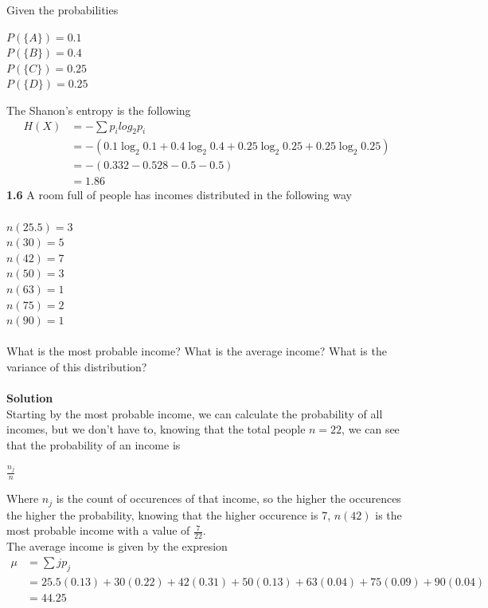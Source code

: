 \documentclass{article}
\begin{document}
Given the probabilities \\
\begin{center}
$P(\{A\}) = 0.1$\\
$P(\{B\}) = 0.4$\\
$P(\{C\}) = 0.25$\\
$P(\{D\}) = 0.25$\\
\end{center}
The Shanon's entropy is the following\\
\begin{align*}
H(X) &= - \sum p_i log_2 p_i\\
&= -(0.1 \log_2 0.1 + 0.4 \log_2 0.4 + 0.25 \log_2 0.25 + 0.25 \log_2 0.25)\\
&= -(0.332 - 0.528 - 0.5 - 0.5)\\
&= 1.86
\end{align*}
\textbf{1.6} A room full of people has incomes distributed in the following way\\ \\
$n(25.5) = 3$\\
$n(30) = 5$\\
$n(42) = 7$\\
$n(50) = 3$\\
$n(63) = 1$\\
$n(75) = 2$\\
$n(90) = 1$\\ \\
What is the most probable income? What is the average income? What is the variance of this distribution?\\ \\
\textbf{Solution}\\
Starting by the most probable income, we can calculate the probability of all incomes, but we don't  have to, knowing that the total people $n = 22$, we can see that the probability of an income is\\
\begin{center}
$\frac{n_j}{n}$
\end{center}
Where $n_j$ is the count of occurences of that income, so the higher the occurences the higher the probability, knowing that the higher occurence is 7, $n(42)$ is the most probable income with a value of $\frac{7}{22}$.\\
The average income is given by the expresion \\
\begin{align*}
\mu &= \sum j p_j\\
&= 25.5(0.13) + 30(0.22) + 42(0.31) + 50(0.13) + 63(0.04) + 75(0.09) + 90(0.04)\\
&= 44.25
\end{align*}
\end{document}
